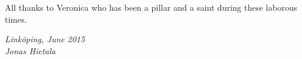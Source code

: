 \begin{acknowledgments}
  All thanks to Veronica who has been a pillar and a saint during these laborous times.

  \addvspace{1em}
  \begin{flushright}
    \textit{%
      Linköping, June 2015\\
      Jonas Hietala%
    }
  \end{flushright}
\end{acknowledgments}

